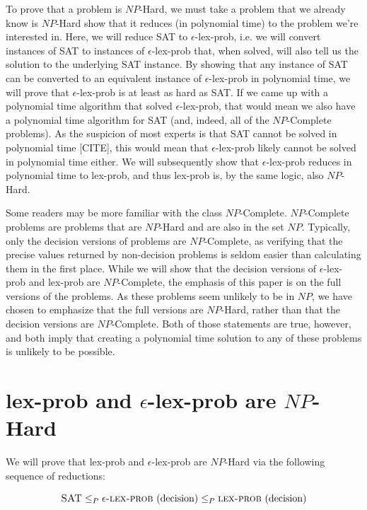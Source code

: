 \documentclass[sigconf]{acmart}
\begin{document}
To prove that a problem is $NP$-Hard, we must take a problem that we already know is $NP$-Hard show that it reduces (in polynomial time) to the problem we're interested in.  Here, we will reduce {\sc SAT} to {\sc $\epsilon$-lex-prob}, i.e. we will convert instances of {\sc SAT} to instances of {\sc $\epsilon$-lex-prob} that, when solved, will also tell us the solution to the underlying {\sc SAT} instance. By showing that any instance of {\sc SAT} can be converted to an equivalent instance of {\sc $\epsilon$-lex-prob} in polynomial time, we will prove that {\sc $\epsilon$-lex-prob} is at least as hard as {\sc SAT}. If we came up with a polynomial time algorithm that solved {\sc $\epsilon$-lex-prob}, that would mean we also have a polynomial time algorithm for {\sc SAT} (and, indeed, all of the $NP$-Complete problems). As the suspicion of most experts is that {\sc SAT} cannot be solved in polynomial time [CITE], this would mean that {\sc $\epsilon$-lex-prob} likely cannot be solved in polynomial time either. We will subsequently show that {\sc $\epsilon$-lex-prob} reduces in polynomial time to {\sc lex-prob}, and thus {\sc lex-prob} is, by the same logic, also $NP$-Hard.

Some readers may be more familiar with the class $NP$-Complete. $NP$-Complete problems are problems that are $NP$-Hard and are also in the set $NP$. Typically, only the decision versions of problems are $NP$-Complete, as verifying that the precise values returned by non-decision problems is seldom easier than calculating them in the first place. While we will show that the decision versions of {\sc $\epsilon$-lex-prob} and {\sc lex-prob} are $NP$-Complete, the emphasis of this paper is on the full versions of the problems. As these problems seem unlikely to be in $NP$, we have chosen to emphasize that the full versions are $NP$-Hard, rather than that the decision versions are $NP$-Complete. Both of those statements are true, however, and both imply that creating a polynomial time solution to any of these problems is unlikely to be possible.

\section{{\sc lex-prob} and {\sc $\epsilon$-lex-prob} are $NP$-Hard}

We will prove that {\sc lex-prob} and {\sc $\epsilon$-lex-prob} are $NP$-Hard via the following sequence of reductions:

\[
\text{{\sc SAT}} \leq_{P} \text{{\sc $\epsilon$-lex-prob} (decision)} \leq_{P} \text{{\sc lex-prob} (decision)}
\]
\end{document}
